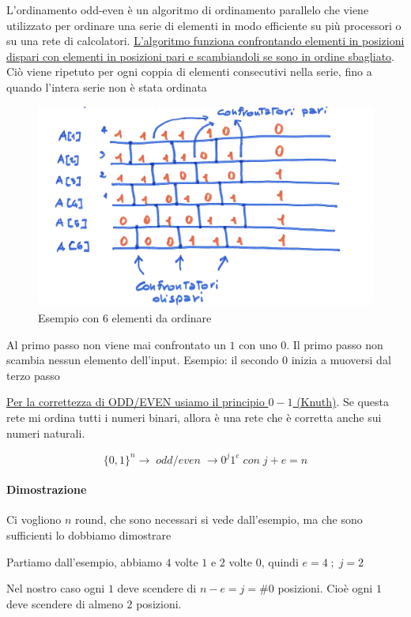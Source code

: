 L'ordinamento odd-even è un algoritmo di ordinamento parallelo che viene utilizzato per ordinare una serie di elementi in modo efficiente su più processori o su una rete di calcolatori. \uline{L'algoritmo funziona confrontando elementi in posizioni dispari con elementi in posizioni pari e scambiandoli se sono in ordine sbagliato}. Ciò viene ripetuto per ogni coppia di elementi consecutivi nella serie, fino a quando l'intera serie non è stata ordinata

\begin{figure}[h]
    \centering
    \includegraphics[scale=0.4]{images/odd_even.png}
    \caption{Esempio con 6 elementi da ordinare}
\end{figure}

Al primo passo non viene mai confrontato un $1$ con uno $0$. Il primo passo non scambia nessun elemento dell'input. Esempio: il secondo $0$ inizia a muoversi dal terzo passo

\uline{Per la correttezza di ODD/EVEN usiamo il principio $0-1$ (Knuth)}. Se questa rete mi ordina tutti i numeri binari, allora è una rete che è corretta anche sui numeri naturali. 

$$\{0,1\}^n \rightarrow\;odd/even\; \rightarrow 0^j1^e\;con\;j+e=n$$

\paragraph{Dimostrazione}
Ci vogliono $n$ round, che sono necessari si vede dall'esempio, ma che sono sufficienti lo dobbiamo dimostrare

Partiamo dall'esempio, abbiamo $4$ volte $1$ e $2$ volte $0$, quindi $e=4\;;\;j=2$

\begin{osservazione}
    Nel nostro caso ogni $1$ deve scendere di $n - e = j = \# 0$ posizioni. Cioè ogni $1$ deve scendere di almeno $2$ posizioni.
\end{osservazione}

